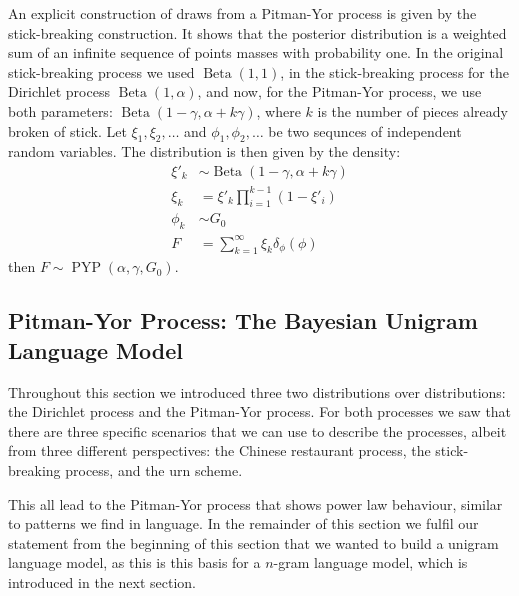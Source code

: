 An explicit construction of draws from a Pitman-Yor process is given by the stick-breaking construction. It shows that the posterior distribution is a weighted sum of an infinite sequence of points masses with probability one. In the original stick-breaking process we used $\operatorname{Beta}(1,1)$, in the stick-breaking process for the Dirichlet process $\operatorname{Beta}(1,\alpha)$, and now, for the Pitman-Yor process, we use both parameters: $\operatorname{Beta}(1-\gamma, \alpha+k\gamma)$, where $k$ is the number of pieces already broken of stick. Let $\xi_1,\xi_2,\ldots$ and $\phi_1, \phi_2,\ldots$ be two sequnces of independent random variables. The distribution is then given by the density:
\begin{align}
	\xi'_k &\sim \operatorname{Beta}(1-\gamma, \alpha+k\gamma)\\
    \xi_k &= \xi'_k\prod_{i=1}^{k-1}(1-\xi'_i) \\
	\phi_k &\sim G_0 \\
	F &= \sum_{k=1}^\infty \xi_k \delta_\phi(\phi)
\end{align}
then $F\sim\operatorname{PYP}(\alpha, \gamma, G_0)$.

\subsection{Pitman-Yor Process: The Bayesian Unigram Language Model}
Throughout this section we introduced three two distributions over distributions: the Dirichlet process and the Pitman-Yor process. For both processes we saw that there are three specific scenarios that we can use to describe the processes, albeit from three different perspectives: the Chinese restaurant process, the stick-breaking process, and the urn scheme.

This all lead to the Pitman-Yor process that shows power law behaviour, similar to patterns we find in language. In the remainder of this section we fulfil our statement from the beginning of this section that we wanted to build a unigram language model, as this is this basis for a $n$-gram language model, which is introduced in the next section.

